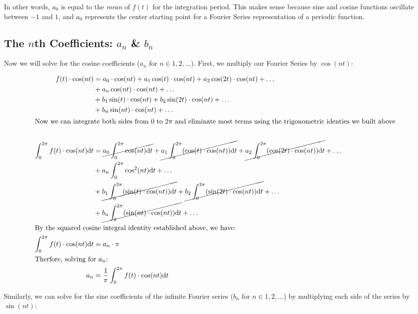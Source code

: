 \documentclass[10pt]{article} %
\begin{document}
In other words, $a_0$ is equal to the \textit{mean} of $f(t)$ for the integration period. This makes sense because sine and cosine functions oscillate between $-1$ and $1$, and $a_0$ represents the center starting point for a Fourier Series representation of a periodic function.

\subsection{The $n$th Coefficients: $a_n$ \& $b_n$}

Now we will solve for the cosine coefficients ($a_n \text{ for } n \in 1, 2, \dots$). First, we multiply our Fourier Series by $\cos(nt)$:

\begin{align*}
    f(t) \cdot \cos(nt) & = a_0 \cdot \cos(nt) + a_1\cos(t) \cdot \cos(nt) + a_2\cos(2t) \cdot \cos(nt) + \dots\\
    & + a_n\cos(nt) \cdot \cos(nt) + \dots \\
    & + b_1\sin(t) \cdot \cos(nt) + b_2\sin(2t) \cdot \cos(nt) + \dots \\
    & + b_n\sin(nt) \cdot \cos(nt) + \dots \\
    \intertext{Now we can integrate both sides from $0$ to $2\pi$ and eliminate most terms using the trigonometric identies we built above}\\
    \int_0^{2\pi}f(t) \cdot \cos(nt)\mathrm{d}t &= \cancel{a_0 \int_0^{2\pi} \cos(nt) \mathrm{d}t} + \cancel{a_1\int_0^{2\pi}(\cos(t) \cdot \cos(nt)) \mathrm{d}t} + \cancel{a_2\int_0^{2\pi}(\cos(2t) \cdot \cos(nt)) \mathrm{d}t} + \dots \\
    & + a_n\int_0^{2\pi} \cos^2(nt) \mathrm{d}t + \dots \\
    & + \cancel{b_1\int_0^{2\pi}(\sin(t) \cdot \cos(nt)) \mathrm{d}t} + \cancel{b_2\int_0^{2\pi}(\sin(2t) \cdot \cos(nt)) \mathrm{d}t} + \dots \\ 
    & + \cancel{b_n\int_0^{2\pi}(\sin(nt) \cdot \cos(nt)) \mathrm{d}t} + \dots \\
    \intertext{By the squared cosine integral identity established above, we have:}
    \int_0^{2\pi}f(t) \cdot \cos(nt)\mathrm{d}t & = a_n \cdot \pi \\
    \intertext{Therfore, solving for $a_n$:}
    a_n & = \frac1\pi \int_0^{2\pi} f(t) \cdot \cos(nt) \mathrm{d}t
\end{align*}

Similarly, we can solve for the sine coefficients of the infinite Fourier series ($b_n \text{ for } n \in 1, 2, \dots$) by multiplying each side of the series by $\sin(nt)$:
\end{document}
